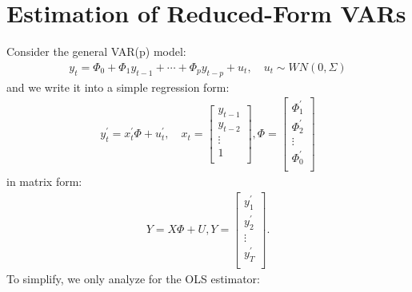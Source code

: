 \section{Estimation of Reduced-Form VARs}
\label{sec:estimation-var}

Consider the general VAR(p) model:
\begin{gather}\label{eq:varest}
    y_t = \Phi_0 + \Phi_1 y_{t-1} + \cdots + \Phi_p y_{t-p} + u_t, \quad u_t \sim WN(0, \Sigma)
\end{gather}
and we write it into a simple regression form:
\begin{gather*}
    y_t^{\prime} = x_t^{\prime} \Phi + u_t^{\prime}, \quad x_t = \begin{bmatrix}
         y_{t-1} \\
         y_{t-2} \\
         \vdots \\
         1 \\
    \end{bmatrix}, \Phi = \begin{bmatrix}
         \Phi_1^{\prime} \\
         \Phi_2^{\prime} \\
         \vdots \\
         \Phi_0^{\prime} \\
    \end{bmatrix}
\end{gather*}
in matrix form:
\begin{gather*}
    Y = X \Phi + U, Y = \begin{bmatrix}
         y_1^{\prime} \\
         y_2^{\prime} \\
         \vdots \\
         y_T^{\prime} \\
    \end{bmatrix}.
\end{gather*}
To simplify, we only analyze for the OLS estimator:
